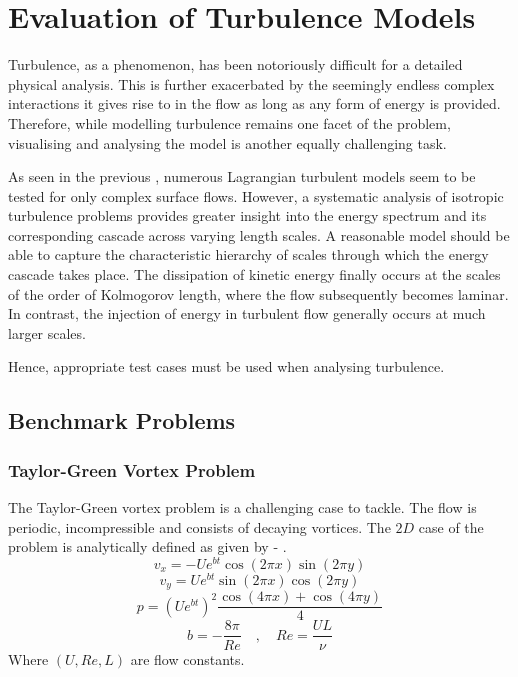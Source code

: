 
\chapter{Evaluation of Turbulence Models}

\label{chap:evaluation-of-turbulence-models}

Turbulence, as a phenomenon, has been notoriously difficult for a detailed physical analysis. This is further exacerbated by the seemingly endless complex interactions it gives rise to in the flow as long as any form of energy is provided.
Therefore, while modelling turbulence remains one facet of the problem, visualising and analysing the model is another equally challenging task.

As seen in the previous , numerous Lagrangian turbulent models seem to be tested for only complex surface flows. However, a systematic analysis of isotropic turbulence problems provides greater insight into the energy spectrum and its corresponding cascade across varying length scales. A reasonable model should be able to capture the characteristic hierarchy of scales through which the energy cascade takes place. The dissipation of kinetic energy finally occurs at the scales of the order of Kolmogorov length, where the flow subsequently becomes laminar. In contrast, the injection of energy in turbulent flow generally occurs at much larger scales.

Hence, appropriate test cases must be used when analysing turbulence.

\section{Benchmark Problems}
\subsection{Taylor-Green Vortex Problem}
The Taylor-Green vortex problem is a challenging case to tackle. The flow is periodic, incompressible and consists of decaying vortices.
The $2D$ case of the problem is analytically defined as given by  - .
\begin{equation}
    v_x = -U e^{bt} \cos(2\pi x) \sin(2\pi y)
    \label{eq:2d-tgv-vx}
\end{equation}
\begin{equation}
    v_y = U e^{bt} \sin(2\pi x) \cos(2\pi y)
    \label{eq:2d-tgv-vy}
\end{equation}
\begin{equation}
    p = (U e^{bt})^2 \frac{\cos(4\pi x) + \cos(4\pi y)}{4}
    \label{eq:2d-tgv-p}
\end{equation}
\begin{equation}
    b = -\frac{8\pi}{Re} \quad , \quad Re = \frac{UL}{\nu}
\end{equation}
Where $(U, Re, L)$ are flow constants.

